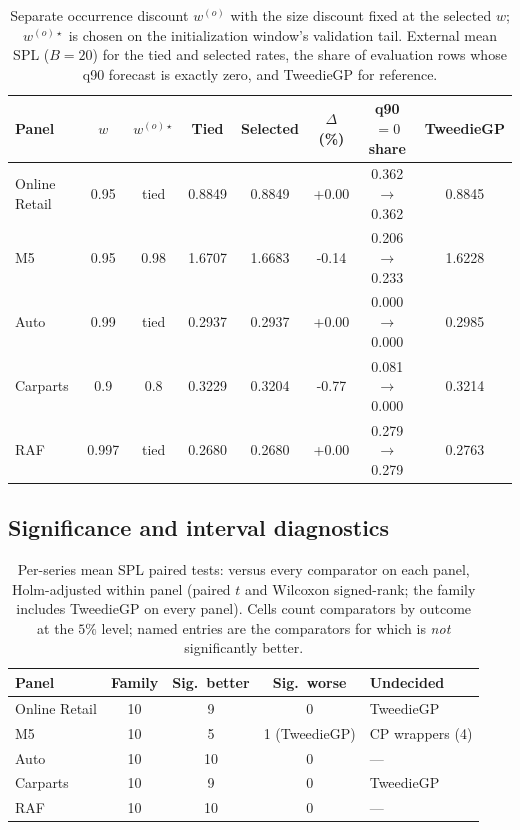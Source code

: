 \begin{table}[t]
\centering
\caption{Separate occurrence discount $w^{(o)}$ with the size discount
fixed at the selected $w$; $w^{(o)\star}$ is chosen on the initialization
window's validation tail. External mean SPL ($B{=}20$) for the tied and
selected rates, the share of evaluation rows whose q90 forecast is exactly
zero, and TweedieGP for reference.}
\label{tab:occdisc}
\small
\setlength{\tabcolsep}{5pt}
\begin{tabular}{lccccccc}
\toprule
Panel & $w$ & $w^{(o)\star}$ & Tied & Selected & $\Delta$ (\%) & q90 $=0$ share & TweedieGP\\
\midrule
Online Retail & 0.95 & tied & 0.8849 & 0.8849 & +0.00 & 0.362 $\to$ 0.362 & 0.8845\\
M5 & 0.95 & 0.98 & 1.6707 & 1.6683 & -0.14 & 0.206 $\to$ 0.233 & 1.6228\\
Auto & 0.99 & tied & 0.2937 & 0.2937 & +0.00 & 0.000 $\to$ 0.000 & 0.2985\\
Carparts & 0.9 & 0.8 & 0.3229 & 0.3204 & -0.77 & 0.081 $\to$ 0.000 & 0.3214\\
RAF & 0.997 & tied & 0.2680 & 0.2680 & +0.00 & 0.279 $\to$ 0.279 & 0.2763\\
\bottomrule
\end{tabular}
\end{table}

\subsection{Significance and interval diagnostics}
\label{sec:significance}

\begin{table}[t]
\centering
\caption{Per-series mean SPL paired tests: \EBB{} versus every
comparator on each panel, Holm-adjusted within panel (paired $t$ and
Wilcoxon signed-rank; the family includes TweedieGP on every
panel). Cells count comparators by outcome at the $5\%$ level; named
entries are the comparators for which \EBB{} is \emph{not}
significantly better.}
\label{tab:spl-significance}
\small
\setlength{\tabcolsep}{4.0pt}
\begin{tabular}{lcccl}
\toprule
Panel & Family & Sig.\ better & Sig.\ worse & Undecided\\
\midrule
Online Retail & 10 & 9 & 0 & TweedieGP\\
M5 & 10 & 5 & 1 (TweedieGP) & CP wrappers (4)\\
Auto & 10 & 10 & 0 & ---\\
Carparts & 10 & 9 & 0 & TweedieGP\\
RAF & 10 & 10 & 0 & ---\\
\bottomrule
\end{tabular}
\end{table}

